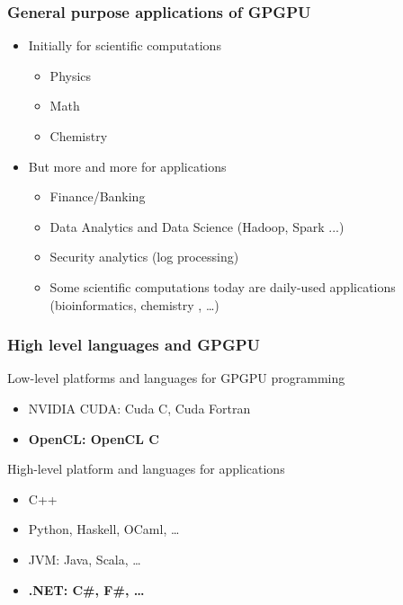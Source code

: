 \documentclass[xcolor=table]{beamer}
\begin{document}
\begin{frame}[fragile]
  \transwipe[direction=90]
  \frametitle{General purpose applications of GPGPU}
  \begin{itemize}
    \item Initially for scientific computations
    \begin{itemize}
      \item Physics
      \item Math
      \item Chemistry
    \end{itemize}
    \item But more and more for applications
      \begin{itemize} 
        \item Finance/Banking
        \item Data Analytics and Data Science (Hadoop, Spark ...)
        \item Security analytics (log processing)
        \item Some scientific computations today are daily-used applications (bioinformatics, chemistry , \dots)
      \end{itemize}
  \end{itemize}
\end{frame}

\begin{frame}
  \transwipe[direction=90]
  \frametitle{High level languages and GPGPU}
\begin{minipage}[m]{0.45\linewidth}
Low-level platforms and languages for GPGPU programming
\begin{itemize}
\item NVIDIA CUDA: Cuda C, Cuda Fortran
\item \textbf{OpenCL: OpenCL C}
\end{itemize}
\end{minipage}\hfill
\begin{minipage}[m]{0.45\linewidth}
High-level platform and languages for applications
\begin{itemize}
      \item C++
      \item Python, Haskell, OCaml, \dots
      \item JVM: Java, Scala, \dots 
      \item \textbf{.NET: C\#, F\#, \dots}
\end{itemize}
\end{minipage}

\pause
\vspace{1cm}
\end{frame}
\end{document}
